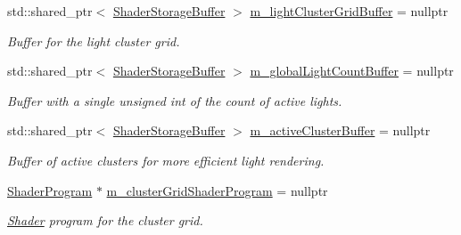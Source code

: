 \begin{Indent}
\begin{DoxyCompactItemize}
std\+::shared\+\_\+ptr$<$ \mbox{\hyperlink{classrev_1_1_shader_storage_buffer}{Shader\+Storage\+Buffer}} $>$ \mbox{\hyperlink{classrev_1_1_light_cluster_grid_ab21de76d7e31d09537004b8cc41e1edc}{m\+\_\+light\+Cluster\+Grid\+Buffer}} = nullptr
\begin{DoxyCompactList}\small\item\em Buffer for the light cluster grid. \end{DoxyCompactList}\item 
\mbox{\label{classrev_1_1_light_cluster_grid_a2e8226cf639539d07b495244fbdd757e}} 
std\+::shared\+\_\+ptr$<$ \mbox{\hyperlink{classrev_1_1_shader_storage_buffer}{Shader\+Storage\+Buffer}} $>$ \mbox{\hyperlink{classrev_1_1_light_cluster_grid_a2e8226cf639539d07b495244fbdd757e}{m\+\_\+global\+Light\+Count\+Buffer}} = nullptr
\begin{DoxyCompactList}\small\item\em Buffer with a single unsigned int of the count of active lights. \end{DoxyCompactList}\item 
\mbox{\label{classrev_1_1_light_cluster_grid_a53752b3ab51cd10141e3f925d9998ae7}} 
std\+::shared\+\_\+ptr$<$ \mbox{\hyperlink{classrev_1_1_shader_storage_buffer}{Shader\+Storage\+Buffer}} $>$ \mbox{\hyperlink{classrev_1_1_light_cluster_grid_a53752b3ab51cd10141e3f925d9998ae7}{m\+\_\+active\+Cluster\+Buffer}} = nullptr
\begin{DoxyCompactList}\small\item\em Buffer of active clusters for more efficient light rendering. \end{DoxyCompactList}\item 
\mbox{\label{classrev_1_1_light_cluster_grid_a077e9b9cb2830176131d2e61d369ab05}} 
\mbox{\hyperlink{classrev_1_1_shader_program}{Shader\+Program}} $\ast$ \mbox{\hyperlink{classrev_1_1_light_cluster_grid_a077e9b9cb2830176131d2e61d369ab05}{m\+\_\+cluster\+Grid\+Shader\+Program}} = nullptr
\begin{DoxyCompactList}\small\item\em \mbox{\hyperlink{classrev_1_1_shader}{Shader}} program for the cluster grid. \end{DoxyCompactList}\end{DoxyCompactItemize}
\end{Indent}
